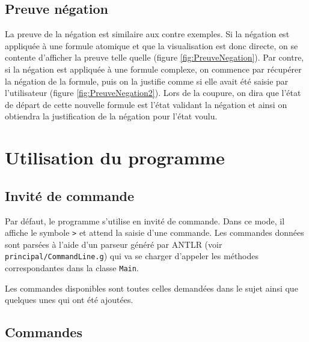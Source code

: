 \documentclass[dvipsnames]{report}
\begin{document}


\subsection{Preuve négation}

La preuve de la négation est similaire aux contre exemples. Si la négation est appliquée à une formule atomique et que la visualisation est donc directe, on se contente d'afficher la preuve telle quelle (figure \ref{fig:PreuveNegation}). Par contre, si la négation est appliquée à une formule complexe, on commence par récupérer la négation de la formule, puis on la justifie comme si elle avait été saisie par l'utilisateur (figure \ref{fig:PreuveNegation2}). Lors de la coupure, on dira que l'état de départ de cette nouvelle formule est l'état validant la négation et ainsi on obtiendra la justification de la négation pour l'état voulu.





\section{Utilisation du programme}

\subsection{Invité de commande}

Par défaut, le programme s'utilise en invité de commande. Dans ce mode, il affiche le symbole \texttt{>} et attend la saisie d'une commande. Les commandes données sont parsées à l'aide d'un parseur généré par ANTLR (voir \texttt{principal/CommandLine.g}) qui va se charger d'appeler les méthodes correspondantes dans la classe \texttt{Main}.

Les commandes disponibles sont toutes celles demandées dans le sujet ainsi que quelques unes qui ont été ajoutées.

\subsection{Commandes}
\end{document}
